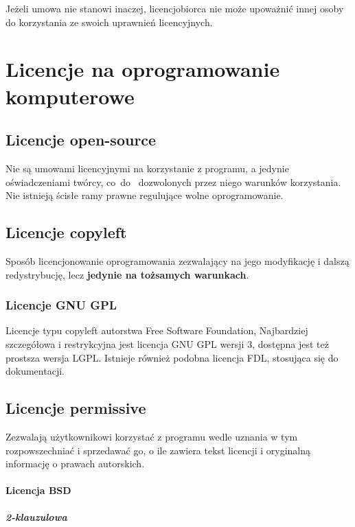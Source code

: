 \documentclass{article}
\begin{document}
Jeżeli umowa nie stanowi inaczej, licencjobiorca nie może upoważnić innej osoby do korzystania ze swoich uprawnień licencyjnych.

\newpage

\section{Licencje na oprogramowanie komputerowe}

\subsection{Licencje open-source}

Nie są umowami licencyjnymi na korzystanie z programu, a jedynie oświadczeniami twórcy, co~do~ dozwolonych przez niego warunków korzystania. Nie istnieją ścisłe ramy prawne regulujące wolne oprogramowanie.

\subsection{Licencje copyleft}

Sposób licencjonowanie oprogramowania zezwalający na jego modyfikację i dalszą redystrybucję, lecz \textbf{jedynie na tożsamych warunkach}.

\subsubsection{Licencje GNU GPL}

Licencje typu copyleft autorstwa Free Software Foundation, Najbardziej szczegółowa i restrykcyjna jest licencja GNU GPL wersji 3, dostępna jest też prostsza wersja LGPL.
Istnieje również podobna licencja FDL, stosująca się do dokumentacji.

\subsection{Licencje permissive}

Zezwalają użytkownikowi korzystać z programu wedle uznania w tym rozpowszechniać i sprzedawać go, o ile zawiera tekst licencji i oryginalną informację o prawach autorskich.

\paragraph{Licencja BSD}

\subparagraph{2-klauzulowa}
\end{document}
